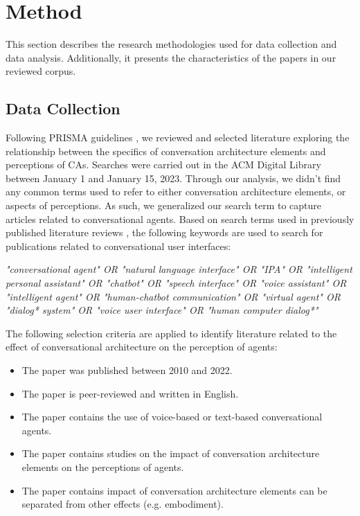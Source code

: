 
\section{Method}

This section describes the research methodologies used for data collection and data analysis. Additionally, it presents the characteristics of the papers in our reviewed corpus.

\subsection{Data Collection}

Following PRISMA guidelines \cite{prisma}, we reviewed and selected literature exploring the relationship between the specifics of conversation architecture elements and perceptions of CAs. Searches were carried out in the ACM Digital Library between January 1 and January 15, 2023. Through our analysis, we didn't find any common terms used to refer to either conversation architecture elements, or aspects of perceptions. As such, we generalized our search term to capture articles related to conversational agents. Based on search terms used in previously published literature reviews \cite{clark2019state}\cite{rapp2021human}, the following keywords are used to search for publications related to conversational user interfaces:
\newline

\textit{"conversational agent" OR "natural language interface" OR "IPA" OR "intelligent personal assistant" OR "chatbot" OR "speech interface" OR "voice assistant" OR "intelligent agent" OR "human-chatbot communication" OR "virtual agent" OR "dialog* system" OR "voice user interface" OR "human computer dialog*"}
\newline

The following selection criteria are applied to identify literature related to the effect of conversational architecture on the perception of agents:
\begin{itemize}
  \item The paper was published between 2010 and 2022.
  \item The paper is peer-reviewed and written in English.
  \item The paper contains the use of voice-based or text-based conversational agents.
  \item The paper contains studies on the impact of conversation architecture elements on the perceptions of agents.
  \item The paper contains impact of conversation architecture elements can be separated from other effects (e.g. embodiment).

\end{itemize}

